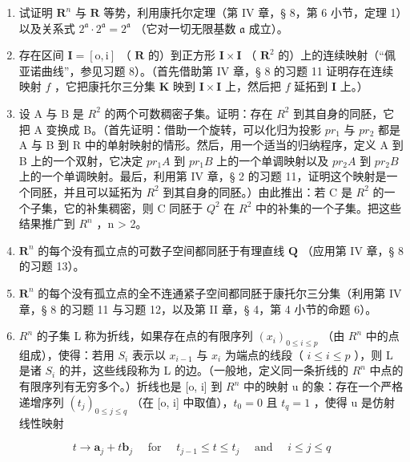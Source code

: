 \ExerciseSection

\begin{enumerate}
\def\labelenumi{\arabic{enumi})}
\item
  试证明 \(\mathbf{R}^n\) 与 \(\mathbf{R}\) 等势，利用康托尔定理（第 IV 章，§ 8，第 6 小节，定理 1）以及关系式 \(2^{\mathfrak{a}} \cdot 2^{\mathfrak{a}} = 2^{\mathfrak{a}}\) （它对一切无限基数 \(\mathfrak{a}\) 成立）。
\item
  存在区间 \(\mathbf{I} = [\mathrm{o},\mathrm{i}]\) （ \(\mathbf{R}\) 的）到正方形 \(\mathbf{I}\times \mathbf{I}\) （ \(\mathbf{R}^2\) 的）上的连续映射（“佩亚诺曲线”，参见习题 8）。（首先借助第 IV 章，§ 8 的习题 11 证明存在连续映射 \(f\) ，它把康托尔三分集 \(\mathbf{K}\) 映到 \(\mathbf{I}\times \mathbf{I}\) 上，然后把 \(f\) 延拓到 \(\mathbf{I}\) 上。）
\item
  设 A 与 B 是 \(R^{2}\) 的两个可数稠密子集。证明：存在 \(R^{2}\) 到其自身的同胚，它把 A 变换成 B。（首先证明：借助一个旋转，可以化归为投影 \(pr_{1}\) 与 \(pr_{2}\) 都是 A 与 B 到 R 中的单射映射的情形。然后，用一个适当的归纳程序，定义 A 到 B 上的一个双射，它决定 \(pr_{1}A\) 到 \(pr_{1}B\) 上的一个单调映射以及 \(pr_{2}A\) 到 \(pr_{2}B\) 上的一个单调映射。最后，利用第 IV 章，§ 2 的习题 11，证明这个映射是一个同胚，并且可以延拓为 \(R^{2}\) 到其自身的同胚。）由此推出：若 C 是 \(R^{2}\) 的一个子集，它的补集稠密，则 C 同胚于 \(Q^{2}\) 在 \(R^{2}\) 中的补集的一个子集。把这些结果推广到 \(R^{n}\) ，n \textgreater{} 2。
\item
  \(\mathbf{R}^n\) 的每个没有孤立点的可数子空间都同胚于有理直线 \(\mathbf{Q}\) （应用第 IV 章，§ 8 的习题 13）。
\item
  \(\mathbf{R}^n\) 的每个没有孤立点的全不连通紧子空间都同胚于康托尔三分集（利用第 IV 章，§ 8 的习题 11 与习题 12，以及第 II 章，§ 4，第 4 小节的命题 6）。
\item
  \(R^{n}\) 的子集 L 称为折线，如果存在点的有限序列 \((x_{i})_{0\leqslant i\leqslant p}\) （由 \(R^{n}\) 中的点组成），使得：若用 \(S_{i}\) 表示以 \(x_{i-1}\) 与 \(x_{i}\) 为端点的线段（ \(i\leqslant i\leqslant p\) ），则 L 是诸 \(S_{i}\) 的并，这些线段称为 L 的边。（一般地，定义同一条折线的 \(R^{n}\) 中点的有限序列有无穷多个。）折线也是 {[}o, i{]} 到 \(R^{n}\) 中的映射 u 的象：存在一个严格递增序列 \((t_{j})_{0\leqslant j\leqslant q}\) （在 {[}o, i{]} 中取值），\(t_{0}=0\) 且 \(t_{q}=1\) ，使得 u 是仿射线性映射
\end{enumerate}

\[
t \rightarrow \boldsymbol {a} _ {j} + t \boldsymbol {b} _ {j} \quad \text { for } \quad t _ {j - 1} \leqslant t \leqslant t _ {j} \quad \text { and } \quad i \leqslant j \leqslant q
\]

